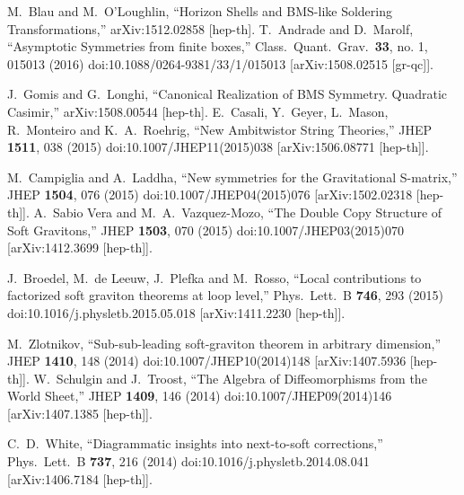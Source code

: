 \documentclass[12pt]{article}
\numberwithin{equation}{section}
\begin{document}
\begin{thebibliography}{99}
  M.~Blau and M.~O'Loughlin,
  ``Horizon Shells and BMS-like Soldering Transformations,''
  arXiv:1512.02858 [hep-th].
  T.~Andrade and D.~Marolf,
  ``Asymptotic Symmetries from finite boxes,''
  Class.\ Quant.\ Grav.\  {\bf 33}, no. 1, 015013 (2016)
  doi:10.1088/0264-9381/33/1/015013
  [arXiv:1508.02515 [gr-qc]].

  J.~Gomis and G.~Longhi,
  ``Canonical Realization of BMS Symmetry. Quadratic Casimir,''
  arXiv:1508.00544 [hep-th].
  E.~Casali, Y.~Geyer, L.~Mason, R.~Monteiro and K.~A.~Roehrig,
  ``New Ambitwistor String Theories,''
  JHEP {\bf 1511}, 038 (2015)
  doi:10.1007/JHEP11(2015)038
  [arXiv:1506.08771 [hep-th]].

  M.~Campiglia and A.~Laddha,
  ``New symmetries for the Gravitational S-matrix,''
  JHEP {\bf 1504}, 076 (2015)
  doi:10.1007/JHEP04(2015)076
  [arXiv:1502.02318 [hep-th]].
  A.~Sabio Vera and M.~A.~Vazquez-Mozo,
  ``The Double Copy Structure of Soft Gravitons,''
  JHEP {\bf 1503}, 070 (2015)
  doi:10.1007/JHEP03(2015)070
  [arXiv:1412.3699 [hep-th]].

  J.~Broedel, M.~de Leeuw, J.~Plefka and M.~Rosso,
  ``Local contributions to factorized soft graviton theorems at loop level,''
  Phys.\ Lett.\ B {\bf 746}, 293 (2015)
  doi:10.1016/j.physletb.2015.05.018
  [arXiv:1411.2230 [hep-th]].

  M.~Zlotnikov,
  ``Sub-sub-leading soft-graviton theorem in arbitrary dimension,''
  JHEP {\bf 1410}, 148 (2014)
  doi:10.1007/JHEP10(2014)148
  [arXiv:1407.5936 [hep-th]].
  W.~Schulgin and J.~Troost,
  ``The Algebra of Diffeomorphisms from the World Sheet,''
  JHEP {\bf 1409}, 146 (2014)
  doi:10.1007/JHEP09(2014)146
  [arXiv:1407.1385 [hep-th]].
 
  C.~D.~White,
  ``Diagrammatic insights into next-to-soft corrections,''
  Phys.\ Lett.\ B {\bf 737}, 216 (2014)
  doi:10.1016/j.physletb.2014.08.041
  [arXiv:1406.7184 [hep-th]].


\end{thebibliography}
\end{document}
